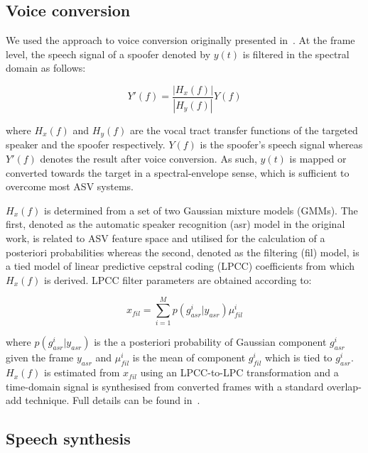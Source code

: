 \subsection{Voice conversion}
\label{ssec:vconv}

We used the approach to voice conversion originally presented in~\cite{Matrouf2005}. At the frame level, the speech signal of a spoofer denoted by $y(t)$ is filtered in the spectral domain as follows:

\begin{equation}
Y'(f) = \frac{\left|H_{x}(f)\right|}{\left|H_{y}(f)\right|}Y(f)
\label{eq:conversioneq}
\end{equation}

\noindent where $H_{x}(f)$ and $H_{y}(f)$ are the vocal tract transfer functions of the targeted speaker and the spoofer respectively.  $Y(f)$ is the spoofer's speech signal whereas $Y'(f)$ denotes the result after voice conversion.  As such, $y(t)$ is mapped or converted towards the target in a spectral-envelope sense, which is sufficient to overcome most ASV systems. 

$H_x(f)$ is determined from a set of two Gaussian mixture models (GMMs).  The first, denoted as the automatic speaker recognition (asr) model in the original work, is related to ASV feature space and utilised for the calculation of a posteriori probabilities whereas the second, denoted as the filtering (fil) model, is a tied model of linear predictive cepstral coding (LPCC) coefficients from which $H_x(f)$ is derived.  LPCC filter parameters are obtained according to:

\begin{equation}
x_{fil} = \sum\limits_{i=1}^{M}p(g_{asr}^{i}|y_{asr}) \mu_{fil}^{i}
\label{eq:EMit}
\end{equation}

\noindent where $p(g_{asr}^{i}|y_{asr})$ is the a posteriori probability of Gaussian component $g_{asr}^{i}$ given the frame $y_{asr}$ and $\mu_{fil}^{i}$ is the mean of component $g_{fil}^{i}$ which is tied to $g_{asr}^{i}$.  $H_{x}(f)$ is estimated from $x_{fil}$ using an LPCC-to-LPC transformation and a time-domain signal is synthesised from converted frames with a standard overlap-add technique. Full details can be found in~\cite{Matrouf2005,Bonastre2006,Bonastre2007}.


\subsection{Speech synthesis}

